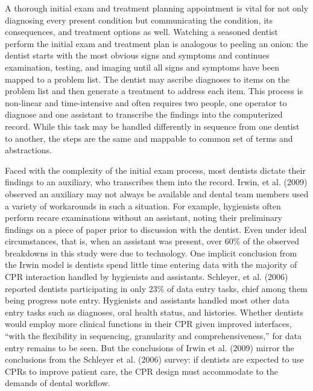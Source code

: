 \documentclass[11pt]{article}
\begin{document}
A thorough initial exam and treatment planning appointment is vital for not only diagnosing every present condition but communicating the condition, its consequences, and treatment options as well. Watching a seasoned dentist perform the initial exam and treatment plan is analogous to peeling an onion: the dentist starts with the most obvious signs and symptoms and continues examination, testing, and imaging until all signs and symptoms have been mapped to a problem list. The dentist may ascribe diagnoses to items on the problem list and then generate a treatment to address each item. This process is non-linear and time-intensive and often requires two people, one operator to diagnose and one assistant to transcribe the findings into the computerized record. While this task may be handled differently in sequence from one dentist to another, the steps are the same and mappable to common set of terms and abstractions.

Faced with the complexity of the initial exam process, most dentists dictate their findings to an auxiliary, who transcribes them into the record. Irwin, et al. (2009) observed an auxiliary may not always be available and dental team members used a variety of workarounds in such a situation. For example, hygienists often perform recare examinations without an assistant, noting their preliminary findings on a piece of paper prior to discussion with the dentist. Even under ideal circumstances, that is, when an assistant was present, over 60\% of the observed breakdowns in this study were due to technology. One implicit conclusion from the Irwin model is dentists spend little time entering data with the majority of CPR interaction handled by hygienists and assistants. Schleyer, et al. (2006) reported dentists participating in only 23\% of data entry tasks, chief among them being progress note entry. Hygienists and assistants handled most other data entry tasks such as diagnoses, oral health status, and histories. Whether dentists would employ more clinical functions in their CPR given improved interfaces, ``with the flexibility in sequencing, granularity and comprehensiveness,'' for data entry remains to be seen. But the conclusions of Irwin et al. (2009) mirror the conclusions from the Schleyer et al. (2006) survey: if dentists are expected to use CPRs to improve patient care, the CPR design must accommodate to the demands of dental workflow.
\end{document}
